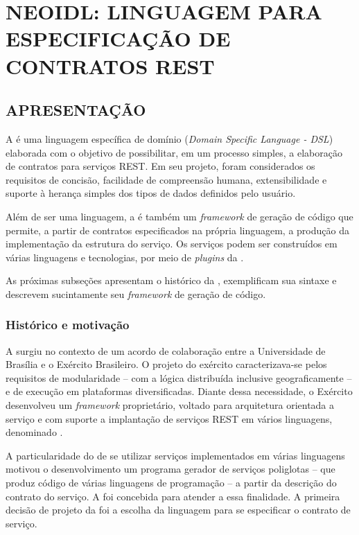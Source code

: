 \chapter{NEOIDL: LINGUAGEM PARA ESPECIFICAÇÃO DE CONTRATOS REST	}
\vspace{-6mm}


\section{APRESENTAÇÃO}
\label{apresentacaoNeoIDL}

A \neoidl{} é uma linguagem específica de domínio (\textit{Domain Specific
Language - DSL}) elaborada com o objetivo de possibilitar, em um processo
simples, a elaboração de contratos para serviços REST. Em seu projeto, 
foram considerados os requisitos de concisão, facilidade de compreensão humana,
extensibilidade e suporte à herança simples dos tipos de dados definidos pelo
usuário.

Além de ser uma linguagem, a \neoidl{} é também um \textit{framework} de geração
de código que permite, a partir de contratos especificados na própria
linguagem, a produção da implementação da estrutura do serviço. Os serviços
podem ser construídos em várias linguagens e tecnologias, por meio
de \textit{plugins} da \neoidl{}.

As próximas subseções apresentam o histórico da \neoidl{}, exemplificam sua
sintaxe e descrevem sucintamente seu \textit{framework} de geração de código.


\subsection{Histórico e motivação}
\label{histMotivNeoIDL}
\vspace{-6mm}

A \neoidl{} surgiu no contexto de um acordo de colaboração entre a Universidade
de Brasília e o Exército Brasileiro. O projeto do exército caracterizava-se
pelos requisitos de modularidade -- com a lógica distribuída inclusive
geograficamente -- e de execução em plataformas diversificadas. Diante dessa
necessidade, o Exército desenvolveu um \textit{framework} proprietário,
voltado para arquitetura orientada a serviço e com suporte
a implantação de serviços REST em vários linguagens, denominado \neocortex{}.

A particularidade do \neocortex{} de se utilizar serviços implementados em
várias linguagens motivou o desenvolvimento um programa gerador de serviços
poliglotas -- que produz código de várias linguagens de programação -- a partir da
descrição do contrato do serviço. A \neoidl{} foi concebida para atender a essa
finalidade. A primeira decisão de projeto da \neoidl{} foi a escolha da
linguagem para se especificar o contrato de serviço.

